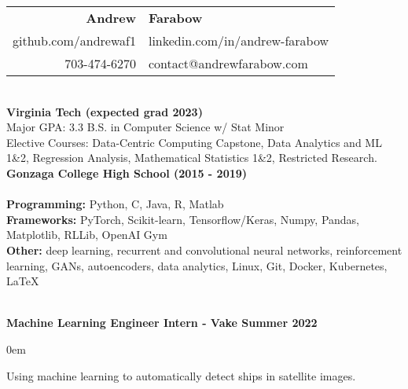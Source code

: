 \documentclass{article}
\begin{document}
\begin{center}
  \begin{tabular}{r l}
    {\huge\textbf{Andrew}}             & {\huge\textbf{Farabow}}        \\
    \hspace{35pt} github.com/andrewaf1 & linkedin.com/in/andrew-farabow \\
    703-474-6270                       & contact@andrewfarabow.com      \\
  \end{tabular}


  \begin{flushleft}
    \begin{multicols}{2}
      {\large\textbf{\underline{}}} \\
      \textbf{Virginia Tech (expected grad 2023)} \\
      Major GPA: 3.3 \; B.S. in Computer Science w/ Stat Minor \\
      Elective Courses: Data-Centric Computing Capstone, Data Analytics and ML 1\&2, Regression Analysis, Mathematical Statistics 1\&2, Restricted Research. \\
      \textbf{Gonzaga College High School	(2015 - 2019)} \\


      \columnbreak
      {\large\textbf{\underline{}}} \\
      {\textbf{Programming:}} Python, C, Java, R, Matlab \\
      {\textbf{Frameworks:}} PyTorch, Scikit-learn, Tensorflow/Keras, Numpy, Pandas, Matplotlib, RLLib, OpenAI Gym \\
      {\textbf{Other:}} deep learning, recurrent and convolutional neural networks, reinforcement learning, GANs, autoencoders, data analytics, Linux, Git, Docker, Kubernetes, LaTeX \\

    \end{multicols}

    {\large\textbf{\underline{}}} \\

    \textbf{Machine Learning Engineer Intern - Vake \hfill Summer 2022}
    \begin{compactitem}
      \itemsep0em
      \item Using machine learning to automatically detect ships in satellite images.
    \end{compactitem}


\end{flushleft}
\end{center}
\end{document}
